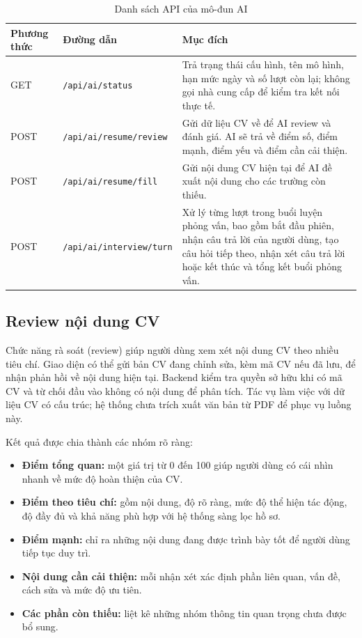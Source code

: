 \begin{table}[H]
    \centering
    \caption{Danh sách API của mô-đun AI}
    \small
    \label{tab:ai-endpoints}
    \begin{tabularx}{\textwidth}{|p{}|p{}|Y|}
        \hline
        \textbf{Phương thức} & \textbf{Đường dẫn} & \textbf{Mục đích} \\
        \hline
        GET & \texttt{/api/ai/status} & Trả trạng thái cấu hình, tên mô hình, hạn mức ngày và số lượt còn lại; không gọi nhà cung cấp để kiểm tra kết nối thực tế. \\
        \hline
        POST & \texttt{/api/ai/resume/review} & Gửi dữ liệu CV về để AI review và đánh giá. AI sẽ trả về điểm số, điểm mạnh, điểm yếu và điểm cần cải thiện. \\
        \hline
        POST & \texttt{/api/ai/resume/fill} & Gửi nội dung CV hiện tại để AI đề xuất nội dung cho các trường còn thiếu. \\
        \hline
        POST & \texttt{/api/ai/interview/turn} & Xử lý từng lượt trong buổi luyện phỏng vấn, bao gồm bắt đầu phiên, nhận câu trả lời của người dùng, tạo câu hỏi tiếp theo, nhận xét câu trả lời hoặc kết thúc và tổng kết buổi phỏng vấn. \\
        \hline
    \end{tabularx}
\end{table}

\subsection{Review nội dung CV}

Chức năng rà soát (review) giúp người dùng xem xét nội dung CV theo nhiều tiêu chí. Giao diện có thể gửi bản CV đang chỉnh sửa, kèm mã CV nếu đã lưu, để nhận phản hồi về nội dung hiện tại. Backend kiểm tra quyền sở hữu khi có mã CV và từ chối đầu vào không có nội dung để phân tích. Tác vụ làm việc với dữ liệu CV có cấu trúc; hệ thống chưa trích xuất văn bản từ PDF để phục vụ luồng này.

Kết quả được chia thành các nhóm rõ ràng:

\begin{itemize}
    \item \textbf{Điểm tổng quan:} một giá trị từ 0 đến 100 giúp người dùng có cái nhìn nhanh về mức độ hoàn thiện của CV.
    \item \textbf{Điểm theo tiêu chí:} gồm nội dung, độ rõ ràng, mức độ thể hiện tác động, độ đầy đủ và khả năng phù hợp với hệ thống sàng lọc hồ sơ.
    \item \textbf{Điểm mạnh:} chỉ ra những nội dung đang được trình bày tốt để người dùng tiếp tục duy trì.
    \item \textbf{Nội dung cần cải thiện:} mỗi nhận xét xác định phần liên quan, vấn đề, cách sửa và mức độ ưu tiên.
    \item \textbf{Các phần còn thiếu:} liệt kê những nhóm thông tin quan trọng chưa được bổ sung.
\end{itemize}

